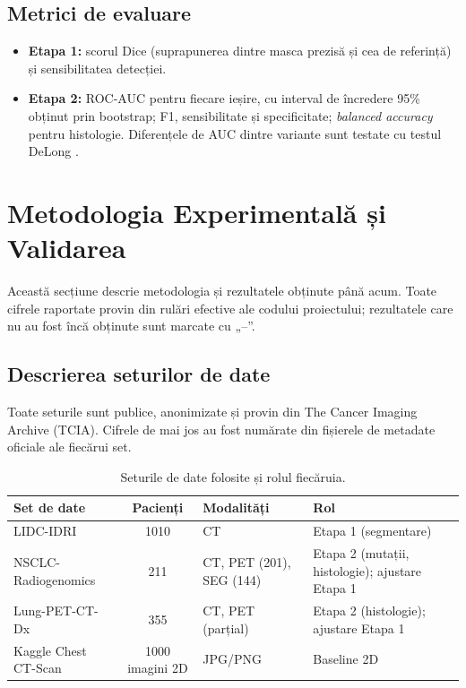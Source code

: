 \documentclass[11pt, a4paper]{article}
\begin{document}
\subsection{Metrici de evaluare}
\begin{itemize}
    \item \textbf{Etapa 1:} scorul Dice (suprapunerea dintre masca prezisă și cea de referință) și sensibilitatea detecției.
    \item \textbf{Etapa 2:} ROC-AUC pentru fiecare ieșire, cu interval de încredere 95\% obținut prin bootstrap; F1, sensibilitate și specificitate; \textit{balanced accuracy} pentru histologie. Diferențele de AUC dintre variante sunt testate cu testul DeLong \cite{delong1988}.
\end{itemize}

\section{Metodologia Experimentală și Validarea}

Această secțiune descrie metodologia și rezultatele obținute până acum. Toate cifrele raportate provin din rulări efective ale codului proiectului; rezultatele care nu au fost încă obținute sunt marcate cu „--''.

\subsection{Descrierea seturilor de date}

Toate seturile sunt publice, anonimizate și provin din The Cancer Imaging Archive (TCIA). Cifrele de mai jos au fost numărate din fișierele de metadate oficiale ale fiecărui set.

\begin{table}[h]
\centering
\small
\begin{tabular}{@{}p{4.3cm}cp{3.4cm}p{4.3cm}@{}}
\toprule
\textbf{Set de date} & \textbf{Pacienți} & \textbf{Modalități} & \textbf{Rol} \\ \midrule
LIDC-IDRI \cite{armato2011} & 1010 & CT & Etapa 1 (segmentare) \\
NSCLC-Radiogenomics \cite{bakr2018} & 211 & CT, PET (201), SEG (144) & Etapa 2 (mutații, histologie); ajustare Etapa 1 \\
Lung-PET-CT-Dx \cite{li2020} & 355 & CT, PET (parțial) & Etapa 2 (histologie); ajustare Etapa 1 \\
Kaggle Chest CT-Scan \cite{kaggle_ct} & 1000 imagini 2D & JPG/PNG & Baseline 2D \\ \bottomrule
\end{tabular}
\caption{Seturile de date folosite și rolul fiecăruia.}
\end{table}
\end{document}
